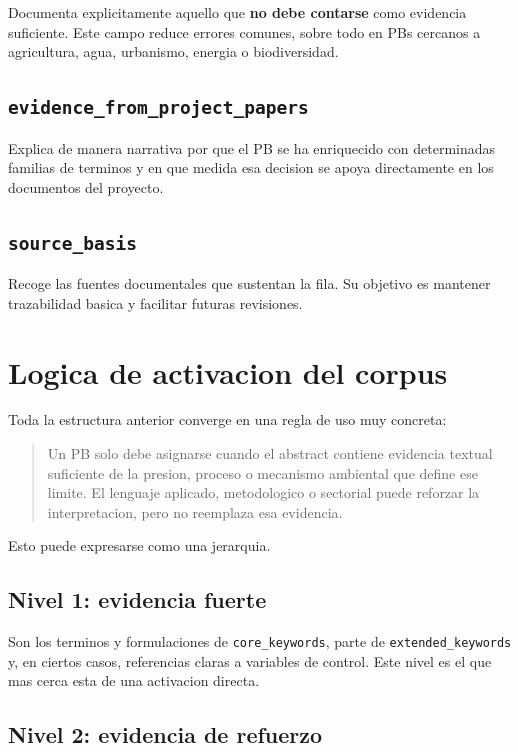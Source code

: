 \documentclass[11pt,a4paper]{article}
\begin{document}
Documenta explicitamente aquello que \textbf{no debe contarse} como evidencia suficiente. Este campo reduce errores comunes, sobre todo en PBs cercanos a agricultura, agua, urbanismo, energia o biodiversidad.

\subsection{\texttt{evidence\_from\_project\_papers}}

Explica de manera narrativa por que el PB se ha enriquecido con determinadas familias de terminos y en que medida esa decision se apoya directamente en los documentos del proyecto.

\subsection{\texttt{source\_basis}}

Recoge las fuentes documentales que sustentan la fila. Su objetivo es mantener trazabilidad basica y facilitar futuras revisiones.

\section{Logica de activacion del corpus}

Toda la estructura anterior converge en una regla de uso muy concreta:

\begin{quote}
Un PB solo debe asignarse cuando el abstract contiene evidencia textual suficiente de la presion, proceso o mecanismo ambiental que define ese limite. El lenguaje aplicado, metodologico o sectorial puede reforzar la interpretacion, pero no reemplaza esa evidencia.
\end{quote}

Esto puede expresarse como una jerarquia.

\subsection{Nivel 1: evidencia fuerte}

Son los terminos y formulaciones de \texttt{core\_keywords}, parte de \texttt{extended\_keywords} y, en ciertos casos, referencias claras a variables de control. Este nivel es el que mas cerca esta de una activacion directa.

\subsection{Nivel 2: evidencia de refuerzo}
\end{document}
